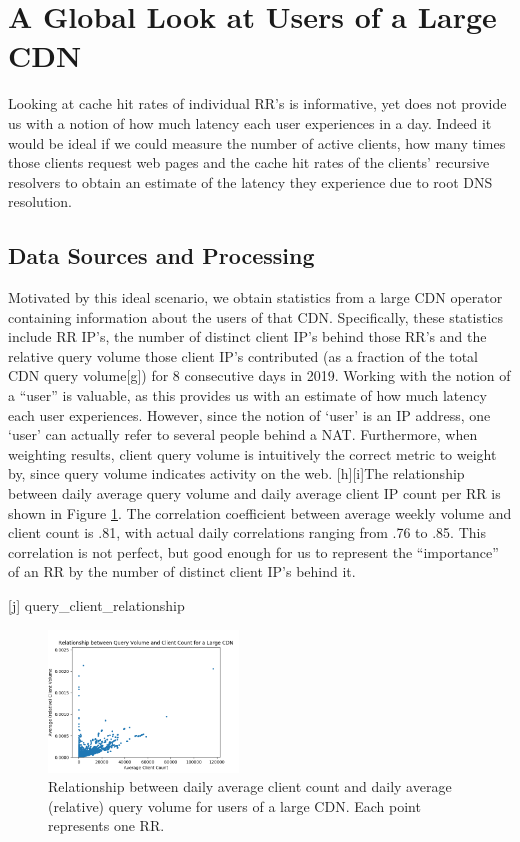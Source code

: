 \documentclass[sigconf,nonacm,10pt]{acmart}
\begin{document}
\section{A Global Look at Users of a Large
CDN}\label{a-global-look-at-users-of-a-large-cdn-1}

Looking at cache hit rates of individual RR's is informative, yet does
not provide us with a notion of how much latency each user experiences
in a day. Indeed it would be ideal if we could measure the number of
active clients, how many times those clients request web pages and the
cache hit rates of the clients' recursive resolvers to obtain an
estimate of the latency they experience due to root DNS resolution.

\subsection{Data Sources and
Processing}\label{data-sources-and-processing-1}

Motivated by this ideal scenario, we obtain statistics from a large CDN
operator containing information about the users of that CDN.
Specifically, these statistics include RR IP's, the number of distinct
client IP's behind those RR's and the relative query volume those client
IP's contributed (as a fraction of the total CDN query volume{[}g{]})
for 8 consecutive days in 2019. Working with the notion of a ``user'' is
valuable, as this provides us with an estimate of how much latency each
user experiences. However, since the notion of `user' is an IP address,
one `user' can actually refer to several people behind a NAT.
Furthermore, when weighting results, client query volume is intuitively
the correct metric to weight by, since query volume indicates activity
on the web. {[}h{]}{[}i{]}The relationship between daily average query
volume and daily average client IP count per RR is shown in Figure
\ref{fig:query_client_relationship}. The correlation coefficient between
average weekly volume and client count is .81, with actual daily
correlations ranging from .76 to .85. This correlation is not perfect,
but good enough for us to represent the ``importance'' of an RR by the
number of distinct client IP's behind it.

{[}j{]} query\_client\_relationship

\begin{figure}
    \centering
    \includegraphics[width=0.45\textwidth]{figures/query_client_relationship.png}
    \caption{Relationship between daily average client count and daily average (relative) query volume for users of a large CDN. Each point represents one RR.}
    \label{fig:query_client_relationship}
\end{figure}
\end{document}
